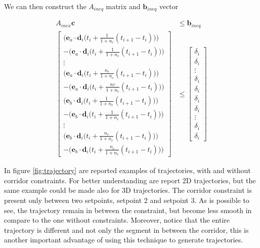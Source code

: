 \noindent We can then construct the $A_{ineq}$ matrix and $\mathbf{b}_{ineq}$ vector

\begin{align}
	A_{inex}\mathbf{c} &\le \mathbf{b}_{ineq} \\
	\begin{bmatrix}
		\Big(\mathbf{e}_a\cdot\mathbf{d}_i\big(t_i+\frac{1}{1+n_c}(t_{i+1}-t_i)\big)\Big) \\
		-\Big(\mathbf{e}_a\cdot\mathbf{d}_i\big(t_i+\frac{1}{1+n_c}(t_{i+1}-t_i)\big)\Big) \\
		\vdots \\
		\Big(\mathbf{e}_a\cdot\mathbf{d}_i\big(t_i+\frac{n_c}{1+n_c}(t_{i+1}-t_i)\big)\Big) \\
		-\Big(\mathbf{e}_a\cdot\mathbf{d}_i\big(t_i+\frac{nc}{1+n_c}(t_{i+1}-t_i)\big)\Big) \\
		\Big(\mathbf{e}_b\cdot\mathbf{d}_i\big(t_i+\frac{1}{1+n_c}(t_{i+1}-t_i)\big)\Big) \\
		-\Big(\mathbf{e}_b\cdot\mathbf{d}_i\big(t_i+\frac{1}{1+n_c}(t_{i+1}-t_i)\big)\Big) \\
		\vdots \\
		\Big(\mathbf{e}_b\cdot\mathbf{d}_i\big(t_i+\frac{n_c}{1+n_c}(t_{i+1}-t_i)\big)\Big) \\
		-\Big(\mathbf{e}_b\cdot\mathbf{d}_i\big(t_i+\frac{n_c}{1+n_c}(t_{i+1}-t_i)\big)\Big)
	\end{bmatrix}
	&\le
	\begin{bmatrix}
		\delta_i \\
		\delta_i \\
		\vdots   \\
		\delta_i \\
		\delta_i \\
		\delta_i \\
		\delta_i \\
		\vdots   \\
		\delta_i \\
		\delta_i
	\end{bmatrix} \nonumber 
\end{align}

\noindent In figure \ref{fig:trajectory} are reported examples of trajectories, with and without corridor constraints. For better understanding are report 2D trajectories, but the same example could be made also for 3D trajectories. The corridor constraint is present only between two setpoints, setpoint 2 and setpoint 3. As is possible to see, the trajectory remain in between the constraint, but become less smooth in compare to the one without constraints. Moreover, notice that the entire trajectory is different and not only the segment in between the corridor, this is another important advantage of using this technique to generate trajectories. 
